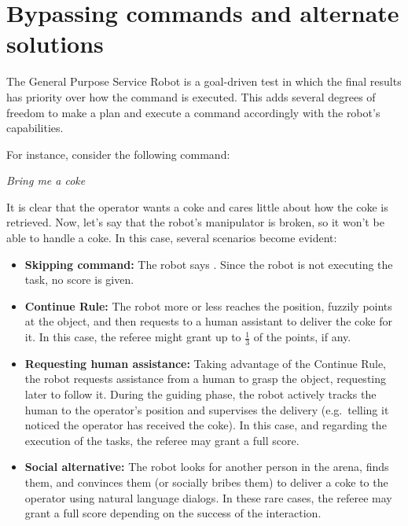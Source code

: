 \section{Bypassing commands and alternate solutions}
The General Purpose Service Robot is a goal-driven test in which the final results has priority over how the command is executed.
This adds several degrees of freedom to make a plan and execute a command accordingly with the robot's capabilities.

For instance, consider the following command:

\begin{center}
\noindent\textit{Bring me a coke}
\end{center}

It is clear that the operator wants a coke and cares little about how the coke is retrieved. Now, let's say that the robot's manipulator is broken, so it won't be able to handle a coke. In this case, several scenarios become evident:

\begin{itemize}
	\item \textbf{Skipping command:} The robot says . Since the robot is not executing the task, no score is given.

	\item \textbf{Continue Rule:} The robot more or less reaches the position, fuzzily points at the object, and then requests to a human assistant to deliver the coke for it. In this case, the referee might grant up to $\frac{1}{3}$ of the points, if any.

	\item \textbf{Requesting human assistance:} Taking advantage of the Continue Rule, the robot requests assistance from a human to grasp the object, requesting later to follow it. During the guiding phase, the robot actively tracks the human to the operator's position and supervises the delivery (e.g.~telling it noticed the operator has received the coke). In this case, and regarding the execution of the tasks, the referee may grant a full score.

	\item \textbf{Social alternative:} The robot looks for another person in the arena, finds them, and convinces them (or socially bribes them) to deliver a coke to the operator using natural language dialogs. In these rare cases, the referee may grant a full score depending on the success of the interaction.
\end{itemize}
